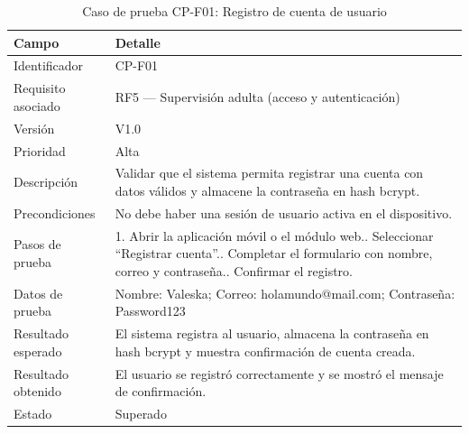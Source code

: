 				\begin{table}[H]
					\centering\small
					\caption{Caso de prueba CP-F01: Registro de cuenta de usuario}
					\label{tab:cpf01}
					\begin{tabular}{p{3cm}p{12.0cm}}
						\hline
						\textbf{Campo} & \textbf{Detalle}\\
						\hline
						Identificador & CP-F01\\
						Requisito asociado & RF5 --- Supervisión adulta (acceso y autenticación)\\
						Versión & V1.0\\
						Prioridad & Alta\\
						Descripción & Validar que el sistema permita registrar una cuenta con datos válidos y almacene la contraseña en hash bcrypt.\\
						Precondiciones & No debe haber una sesión de usuario activa en el dispositivo.\\
						Pasos de prueba & 1. Abrir la aplicación móvil o el módulo web.\newline 2. Seleccionar ``Registrar cuenta''.\newline 3. Completar el formulario con nombre, correo y contraseña.\newline 4. Confirmar el registro.\\
						Datos de prueba & Nombre: Valeska; Correo: holamundo@mail.com; Contraseña: Password123\\
						Resultado esperado & El sistema registra al usuario, almacena la contraseña en hash bcrypt y muestra confirmación de cuenta creada.\\
						Resultado obtenido & El usuario se registró correctamente y se mostró el mensaje de confirmación.\\
						Estado & Superado\\
						\hline
					\end{tabular}
				\end{table}
				\tblnote
				
